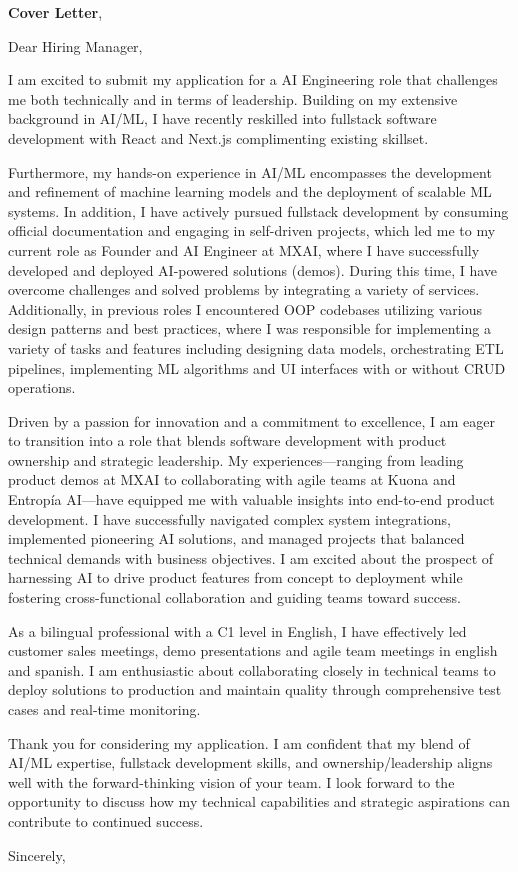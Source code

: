 \documentclass[11pt,a4paper,roman]{moderncv}
\begin{document}
\date{\today}
\opening{\textbf{Cover Letter}, \vspace{-1em}}

\makelettertitle

Dear Hiring Manager,

I am excited to submit my application for a AI Engineering role
that challenges me both technically and in terms of leadership.
Building on my extensive background in AI/ML, I have recently 
reskilled into fullstack software development with React and Next.js complimenting existing skillset.

Furthermore, my hands-on experience in AI/ML encompasses the development and refinement
of machine learning models and the deployment of scalable ML systems.
In addition, I have actively pursued fullstack development by consuming 
official documentation and engaging in self-driven projects,
which led me to my current role as Founder and AI Engineer at MXAI,
where I have successfully developed and deployed AI-powered solutions (demos).
During this time, I have overcome challenges and solved problems 
by integrating a variety of services.
Additionally, in previous roles I encountered OOP codebases 
utilizing various design patterns and best practices,
where I was responsible for implementing a variety of tasks and features 
including designing data models, orchestrating ETL pipelines, 
implementing ML algorithms and 
UI interfaces with or without 
CRUD operations.

Driven by a passion for innovation and a commitment to excellence, 
I am eager to transition into a role that blends software development 
with product ownership and strategic leadership.
My experiences—ranging from leading product demos at MXAI to 
collaborating with agile teams at Kuona and Entropía AI—have equipped 
me with valuable insights into end-to-end product development.
I have successfully navigated complex system integrations, 
implemented pioneering AI solutions, and managed projects that 
balanced technical demands with business objectives.
I am excited about the prospect of harnessing AI to drive product 
features from concept to deployment while fostering cross-functional 
collaboration and guiding teams toward success.

As a bilingual professional with a C1 level in English, 
I have effectively led customer sales meetings, demo 
presentations and agile team meetings in english and spanish. I am enthusiastic 
about collaborating closely in technical teams to deploy solutions 
to production and maintain quality through comprehensive test 
cases and real-time monitoring.

Thank you for considering my application.
I am confident that my blend of AI/ML expertise, 
fullstack development skills, and ownership/leadership
aligns well with the forward-thinking vision of your team.
I look forward to the opportunity to discuss how my 
technical capabilities and strategic aspirations can 
contribute to continued success.

Sincerely,
\makeletterclosing
\end{document}
